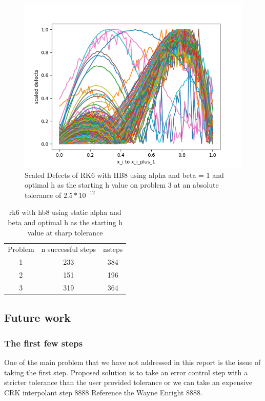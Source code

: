 \documentclass{article}
\begin{document}
\begin{figure}[H]
\centering
\includegraphics[width=0.7\linewidth]{./figures/sharp_tolerance_rk6_with_hb8_p3_scaled_defects}
\caption{Scaled Defects of RK6 with HB8 using alpha and beta = 1 and optimal h as the starting h value on problem 3 at an absolute tolerance of $2.5*10^{-12}$}
\label{fig:sharp_tolerance_rk6_with_hb8_p3_scaled_defects}
\end{figure}

\begin{table}[h]
\caption {rk6 with hb8 using static alpha and beta and optimal h as the starting h value at sharp tolerance} \label{tab:rk6_with_hb8_sharp_tolerance}
\begin{center}
\begin{tabular}{ c c c } 
Problem & n successful steps      &       nsteps    \\ 
1       & 233                     &        384      \\ 
2       & 151                     &        196      \\
3       & 319                     &        364      \\
\end{tabular}
\end{center}
\end{table}	


\subsection{Future work}
\label{section:HB_future_work}
\subsubsection{The first few steps}
One of the main problem that we have not addressed in this report is the issue of taking the first step. Proposed solution is to  take an error control step with a stricter tolerance than the user provided tolerance or we can take an expensive CRK interpolant step 8888 Reference the Wayne Enright 8888.
\end{document}
